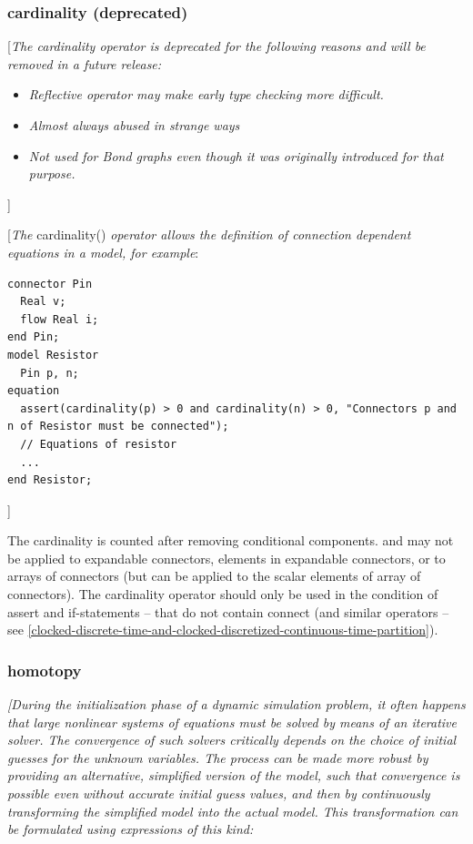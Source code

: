 \documentclass[10pt,a4paper]{report}
\def\doublelabel#1{\label{#1}\hypertarget{#1}{}}
\begin{document}
\subsubsection{cardinality (deprecated)}\doublelabel{cardinality-deprecated}

{[}\emph{The cardinality operator is deprecated for the following
reasons and will be removed in a future release:}

\begin{itemize}
\item
  \emph{Reflective operator may make early type checking more
  difficult.}
\item
  \emph{Almost always abused in strange ways}
\item
  \emph{Not used for Bond graphs even though it was originally
  introduced for that purpose.}
\end{itemize}

{]}

{[}\emph{The} cardinality() \emph{operator allows the definition of
connection dependent equations in a model, for example}:

\begin{lstlisting}[language=modelica]
connector Pin
  Real v;
  flow Real i;
end Pin;
model Resistor
  Pin p, n;
equation
  assert(cardinality(p) > 0 and cardinality(n) > 0, "Connectors p and n of Resistor must be connected");
  // Equations of resistor
  ...
end Resistor;
\end{lstlisting}

{]}

The cardinality is counted after removing conditional components. and
may not be applied to expandable connectors, elements in expandable
connectors, or to arrays of connectors (but can be applied to the scalar
elements of array of connectors). The cardinality operator should only
be used in the condition of assert and if-statements -- that do not
contain connect (and similar operators -- see \ref{clocked-discrete-time-and-clocked-discretized-continuous-time-partition}).

\subsubsection{homotopy}\doublelabel{homotopy}

\emph{{[}During the initialization phase of a dynamic simulation
problem, it often happens that large nonlinear systems of equations must
be solved by means of an iterative solver. The convergence of such
solvers critically depends on the choice of initial guesses for the
unknown variables. The process can be made more robust by providing an
alternative, simplified version of the model, such that convergence is
possible even without accurate initial guess values, and then by
continuously transforming the simplified model into the actual model.
This transformation can be formulated using expressions of this kind:}
\end{document}
